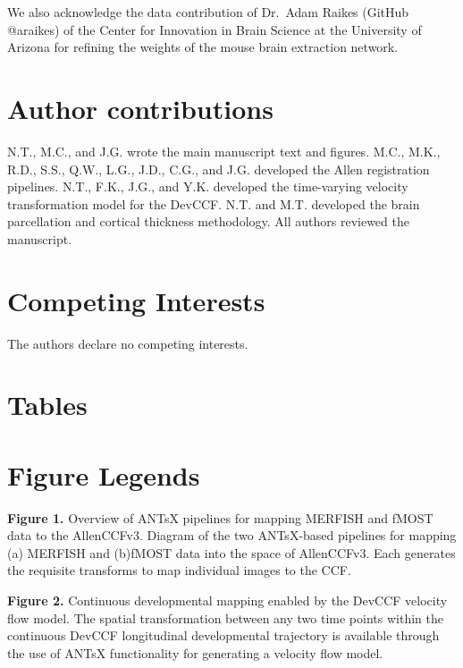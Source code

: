 \documentclass[
  12pt,
]{article}
\begin{document}
We also acknowledge the data contribution of Dr.~Adam Raikes (GitHub
@araikes) of the Center for Innovation in Brain Science at the
University of Arizona for refining the weights of the mouse brain
extraction network.

\clearpage

\section*{Author contributions}\label{author-contributions}

N.T., M.C., and J.G. wrote the main manuscript text and figures. M.C.,
M.K., R.D., S.S., Q.W., L.G., J.D., C.G., and J.G. developed the Allen
registration pipelines. N.T., F.K., J.G., and Y.K. developed the
time-varying velocity transformation model for the DevCCF. N.T. and M.T.
developed the brain parcellation and cortical thickness methodology. All
authors reviewed the manuscript. \clearpage

\section*{Competing Interests}\label{competing-interests}

The authors declare no competing interests. \clearpage 

\section*{Tables}\label{tables}



\clearpage

\section*{Figure Legends}\label{figure-legends}

\textbf{Figure 1.} Overview of ANTsX pipelines for mapping MERFISH and
fMOST data to the AllenCCFv3. Diagram of the two ANTsX-based pipelines
for mapping (a) MERFISH and (b)fMOST data into the space of AllenCCFv3.
Each generates the requisite transforms to map individual images to the
CCF.

\textbf{Figure 2.} Continuous developmental mapping enabled by the
DevCCF velocity flow model. The spatial transformation between any two
time points within the continuous DevCCF longitudinal developmental
trajectory is available through the use of ANTsX functionality for
generating a velocity flow model.
\end{document}
